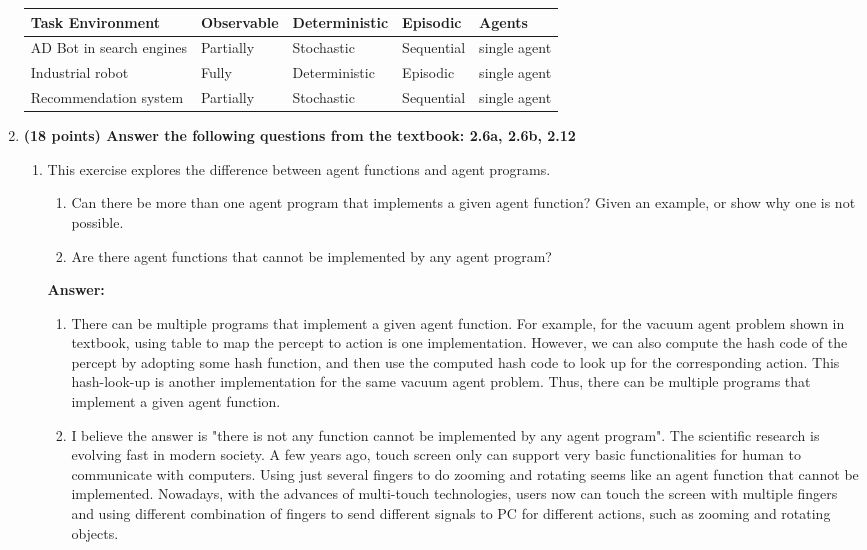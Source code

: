 \documentclass{article}%
\begin{document}
\begin{enumerate}
	\begin{tabular}{|p{2.5cm}|p{2.5cm}|p{2.5cm}|p{2cm}|p{2cm}|}
	\hline  \textbf{Task Environment} &  \textbf{Observable}&  \textbf{Deterministic }& \textbf{Episodic }& \textbf{Agents}  \\ 
	\hline  AD Bot in search engines &  Partially &  Stochastic & Sequential  & single agent\\ 
	\hline  Industrial robot  & Fully & Deterministic & Episodic & single agent \\ 
	\hline  Recommendation system &  Partially  &  Stochastic & Sequential  &single agent\\ 
	\hline 
	\end{tabular} 



\item \textbf{(18 points) Answer the following questions from the textbook: 2.6a, 2.6b, 2.12}

	\begin{enumerate}
	\item This exercise explores the difference between agent functions and agent programs.

		\begin{enumerate}
		\item Can there be more than one agent program that implements a given agent function? Given an example, or show why one is not possible.
		\item Are there agent functions that cannot be implemented by any agent program?
		\end{enumerate}

\textbf{	Answer:}
		\begin{enumerate}
		\item There can be multiple programs that implement a given agent function. For example, for the vacuum agent problem shown in textbook, using table to map the percept to action is one implementation. However, we can also compute the hash code of the percept by adopting some hash function, and then use the computed hash code to look up for the corresponding action. This hash-look-up is another implementation for the same vacuum agent problem. Thus,  there can be multiple programs that implement a given agent function. 
		\item I believe the answer is "there is not any function cannot be implemented by any agent program". The scientific research is evolving fast in modern society. A few years ago, touch screen only can support very basic functionalities for human to communicate with computers. Using just several fingers to do zooming and rotating seems like an agent function that cannot be implemented. Nowadays, with the advances of multi-touch technologies, users now can touch the screen with multiple fingers and using different combination of fingers to send different signals to PC for different actions, such as zooming and rotating objects. 
		\end{enumerate}


\end{enumerate}
\end{enumerate}
\end{document}
